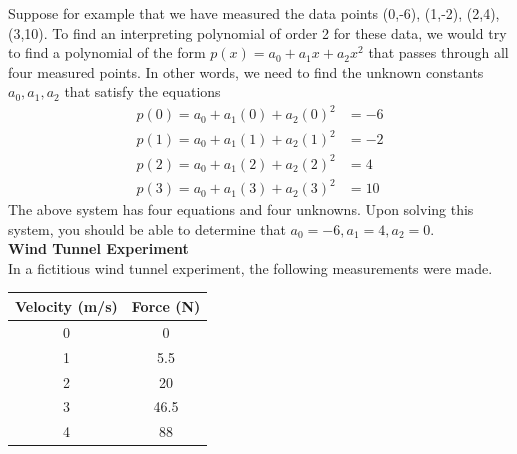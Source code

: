 \documentclass{article}
\begin{document}
\begin{enumerate}
Suppose for example that we have measured the data points (0,-6), (1,-2), (2,4), (3,10). To find an interpreting polynomial of order 2 for these data, we would try to find a polynomial of the form $p(x) = a_0+a_1x+a_2x^2$ that passes through all four measured points. In other words, we need to find the unknown constants $a_0, a_1, a_2$ that satisfy the equations
\begin{align*}
p(0) = a_0+a_1(0)+a_2(0)^2 &= -6 \\
p(1) = a_0+a_1(1)+a_2(1)^2 &= -2 \\
p(2) = a_0+a_1(2)+a_2(2)^2 &= 4  \\
p(3) = a_0+a_1(3)+a_2(3)^2 &= 10 
\end{align*}
The above system has four equations and four unknowns. Upon solving this system, you should be able to determine that $a_0 = -6, a_1 = 4, a_2=0$.\\

\textbf{Wind Tunnel Experiment}\\
In a fictitious wind tunnel experiment, the following measurements were made. 
\begin{center}
  \begin{tabular}{ c c }
    Velocity (m/s) & Force (N)  \\ \hline
     0  & 0 \\
    1 & 5.5 \\
    2 & 20 \\
    3 & 46.5 \\
    4 & 88
  \end{tabular}
\end{center}


\end{enumerate}
\end{document}
